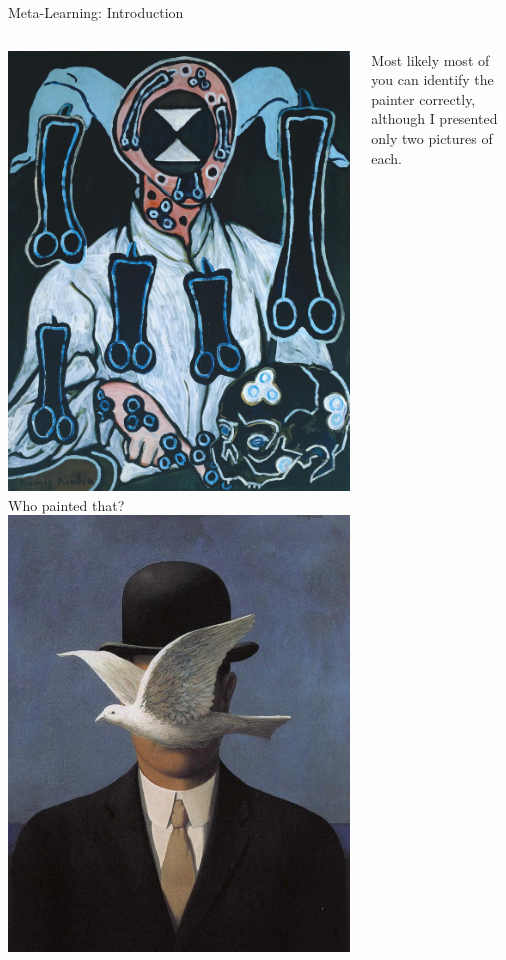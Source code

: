 \begin{frame}[c]{Meta-Learning: Introduction}
\begin{columns}
	\includegraphics[width=.7\textwidth]{images/meta_learning/picabia_1.jpg}
	\centering
	Who painted that?
	\includegraphics[width=.8\textwidth]{images/meta_learning/magritte_3.jpg}
	
	\pause
	Most likely most of you can identify the painter correctly, 
	although I presented only two pictures of each.
\end{columns}

\end{frame}
